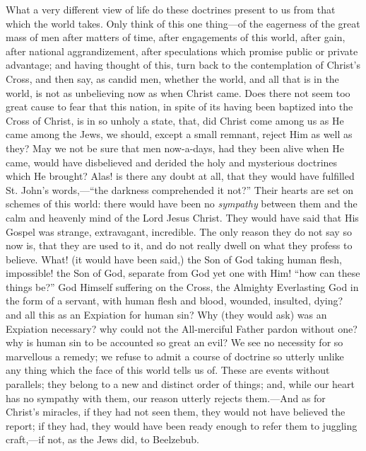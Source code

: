 What a very different view of life do these doctrines present to us
from that which the world takes. Only think of this one thing—of the
eagerness of the great mass of men after matters of time, after
engagements of this world, after gain, after national aggrandizement,
after speculations which promise public or private advantage; and having
thought of this, turn back to the contemplation of Christ's Cross, and
then say, as candid men, whether the world, and all that is in the
world, is not as unbelieving now as when Christ came. Does there not
seem too great cause to fear that this nation, in spite of its having
been baptized into the Cross of Christ, is in so unholy a state, that,
did Christ come among us as He came among the Jews, we should, except a
small remnant, reject Him as well as they? May we not be sure that men
now-a-days, had they been alive when He came, would have disbelieved and
derided the holy and mysterious doctrines which He brought? Alas! is
there any doubt at all, that they would have fulfilled St. John's words,—``the
darkness comprehended it not?'' Their hearts are set on schemes of
this world: there would have been no \emph{sympathy} between them and
the calm and heavenly mind of the Lord Jesus Christ. They would have
said that His Gospel was strange, extravagant, incredible. The only
reason they do not say so now is, that they are used to it, and do not
really dwell on what they profess to believe. What! (it would have been
said,) the Son of God taking human flesh, impossible! the Son of God,
separate from God yet one with Him! ``how can these things be?''
God Himself suffering on the Cross, the Almighty Everlasting God in the
form of a servant, with human flesh and blood, wounded, insulted, dying?
and all this as an Expiation for human sin? Why (they would ask) was an
Expiation necessary? why could not the All-merciful Father pardon
without one? why is human sin to be accounted so great an evil? We see
no necessity for so marvellous a remedy; we refuse to admit a course of
doctrine so utterly unlike any thing which the face of this world tells
us of. These are events without parallels; they belong to a new and
distinct order of things; and, while our heart has no sympathy with
them, our reason utterly rejects them.—And as for Christ's miracles,
if they had not seen them, they would not have believed the report; if
they had, they would have been ready enough to refer them to juggling
craft,—if not, as the Jews did, to Beelzebub.

